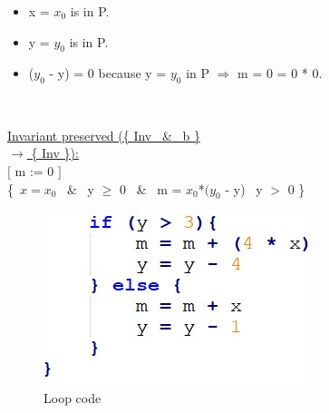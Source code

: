 \documentclass[a4paper,12pt]{article}
\begin{document}
\newline

\begin{itemize}[label = {\checkmark}]
    \item x = $x_{0}$ is in P.
    \item y = $y_{0}$ is in P.
    \item ($y_{0}$ - y) = 0 because y = $y_{0}$ in P $\Rightarrow$ m = 0 = 0 * 0.
\end{itemize} \\

\newpage

\underline{Invariant preserved (\{ Inv \ \& \ b \} \[ \] $\rightarrow$ \{ Inv \}):} \\

$[$ m := 0 $]$ \\
\{\ $x = x_{0}$ \ \& \ y $\geq$ 0 \ \& \ m = $x_{0}$*$(y_{0}$ - y) \ y $>$ 0 \}\ \\

\begin{figure}[H]
    \centering
	\includegraphics[scale = 1.0]{images/loop code.jpg}
	\caption{Loop code}
	\label{fig:loopCode}
\end{figure}
\end{document}

